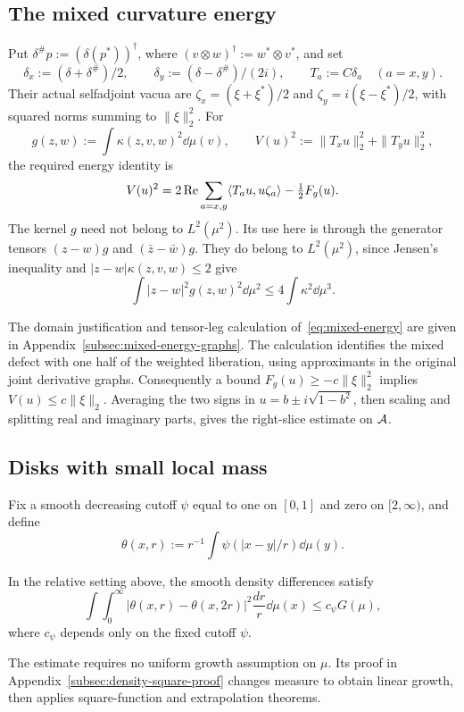 \subsection{The mixed curvature energy}
Put $\delta^\#p:=(\delta(p^*))^\dagger$, where $(v\otimes w)^\dagger:=w^*\otimes v^*$, and set
\[
 \delta_x:=(\delta+\delta^\#)/2,\qquad
 \delta_y:=(\delta-\delta^\#)/(2i),\qquad T_a:=C\delta_a\quad(a=x,y).
\]
Their actual selfadjoint vacua are $\zeta_x=(\xi+\xi^*)/2$ and $\zeta_y=i(\xi-\xi^*)/2$, with squared norms summing to $\|\xi\|_2^2$.
For
\[
 g(z,w):=\int\kappa(z,v,w)^2\dd\mu(v),\qquad
 V(u)^2:=\|T_xu\|_2^2+\|T_yu\|_2^2,
\]
the required energy identity is
\begin{equation}\label{eq:mixed-energy}
 V(u)^2=2\operatorname{Re}\sum_{a=x,y}\langle T_au,u\zeta_a\rangle-\tfrac12F_g(u).
\end{equation}
The kernel $g$ need not belong to $L^2(\mu^2)$.
Its use here is through the generator tensors $(z-w)g$ and $(\bar z-\bar w)g$.
They do belong to $L^2(\mu^2)$, since Jensen's inequality and $|z-w|\kappa(z,v,w)\le2$ give
\begin{equation}\label{eq:gap-g}
 \int|z-w|^2g(z,w)^2\dd\mu^2\le4\int\kappa^2\dd\mu^3.
\end{equation}

The domain justification and tensor-leg calculation of~\eqref{eq:mixed-energy} are given in Appendix~\ref{subsec:mixed-energy-graphs}.
The calculation identifies the mixed defect with one half of the weighted liberation, using approximants in the original joint derivative graphs.
Consequently a bound $F_g(u)\ge-c\|\xi\|_2^2$ implies $V(u)\le c\|\xi\|_2$.
Averaging the two signs in $u=b\pm i\sqrt{1-b^2}$, then scaling and splitting real and imaginary parts, gives the right-slice estimate on $\mathcal A$.

\subsection{Disks with small local mass}
Fix a smooth decreasing cutoff $\psi$ equal to one on $[0,1]$ and zero on $[2,\infty)$, and define
\[
 \theta(x,r):=r^{-1}\int\psi(|x-y|/r)\dd\mu(y).
\]
\begin{lemma}\label{lem:density-square}
In the relative setting above, the smooth density differences satisfy
\begin{equation}\label{eq:density-square}
 \int\int_0^\infty|\theta(x,r)-\theta(x,2r)|^2\frac{dr}{r}\dd\mu(x)
 \le c_\psi G(\mu),
\end{equation}
where $c_\psi$ depends only on the fixed cutoff $\psi$.
\end{lemma}
The estimate requires no uniform growth assumption on $\mu$.
Its proof in Appendix~\ref{subsec:density-square-proof} changes measure to obtain linear growth, then applies square-function and extrapolation theorems.

